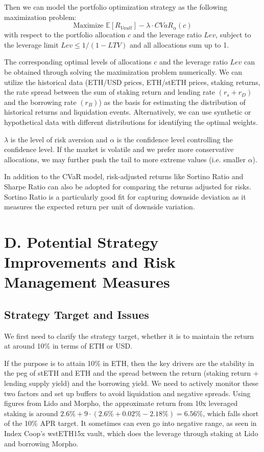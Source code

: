 \documentclass[11pt, a4paper]{article}
\begin{document}
Then we can model the portfolio optimization strategy as the following maximization problem:
\begin{equation*}
    \text{Maximize } \mathbb{E}[R_{Vault}] - \lambda \cdot CVaR_{\alpha}(c)
\end{equation*}
with respect to the portfolio allocation $c$ and the leverage ratio $Lev$, subject to the leverage limit $Lev \le 1/(1-LTV)$ and all allocations sum up to 1.

The corresponding optimal levels of allocations $c$ and the leverage ratio $Lev$ can be obtained through solving the maximization problem numerically. We can utilize the historical data (ETH/USD prices, ETH/stETH prices, staking returns, the rate spread between the sum of staking return and lending rate $(r_s + r_D)$ and the borrowing rate $(r_B)$) as the basis for estimating the distribution of historical returns and liquidation events. Alternatively, we can use synthetic or hypothetical data with different distributions for identifying the optimal weights. 

$\lambda$ is the level of risk aversion and $\alpha$ is the confidence level controlling the confidence level. If the market is volatile and we prefer more conservative allocations, we may further push the tail to more extreme values (i.e. smaller $\alpha$).

In addition to the CVaR model, risk-adjusted returns like Sortino Ratio and Sharpe Ratio can also be adopted for comparing the returns adjusted for risks. Sortino Ratio is a particularly good fit for capturing downside deviation as it measures the expected return per unit of downside variation.

\section*{D. Potential Strategy Improvements and Risk Management Measures}

\subsection*{Strategy Target and Issues}
We first need to clarify the strategy target, whether it is to maintain the return at around 10\% in terms of ETH or USD. 

If the purpose is to attain 10\% in ETH, then the key drivers are the stability in the peg of stETH and ETH and the spread between the return (staking return + lending supply yield) and the borrowing yield. We need to actively monitor these two factors and set up buffers to avoid liquidation and negative spreads. Using figures from Lido and Morpho, the approximate return from 10x leveraged staking is around $2.6\% + 9 \cdot (2.6\% + 0.02\% - 2.18\%) = 6.56\%$, which falls short of the 10\% APR target. It sometimes can even go into negative range, as seen in Index Coop's wstETH15x vault, which does the leverage through staking at Lido and borrowing Morpho.
\end{document}
